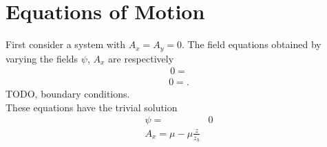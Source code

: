 \documentclass[12pt]{report}
\newcommand{\At}{\ensuremath{{A_x}}}
\begin{document}
\section{Equations of Motion}
First consider a system with $A_x=A_y=0$. The field equations obtained by varying the fields $\psi$, $\At$ are respectively
\begin{eqnarray}
0=
\end{eqnarray}
\begin{eqnarray}
0=.
\end{eqnarray}
TODO, boundary conditions.\\
These equations have the trivial solution
\begin{equation}
 \begin{split}
  \psi=&0\\
  \At=\mu-\mu\frac{z}{z_h}\label{trivial}
 \end{split}
\end{equation}
\end{document}
